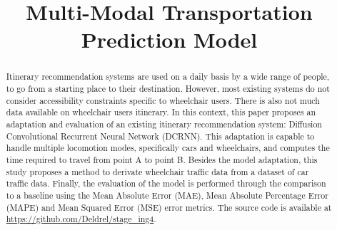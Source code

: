 \documentclass[conference]{IEEEtran}
\begin{document}



    \title{Multi-Modal Transportation Prediction Model}
    \author{
        \and
        \and
    }

    \maketitle

    \begin{abstract}
        Itinerary recommendation systems are used on a daily basis by a wide range of people, to go from a starting place to their destination.
        However, most existing systems do not consider accessibility constraints specific to wheelchair users.
        There is also not much data available on wheelchair users itinerary.
        In this context, this paper proposes an adaptation and evaluation of an existing itinerary recommendation system: Diffusion Convolutional Recurrent Neural Network (DCRNN).
        This adaptation is capable to handle multiple locomotion modes, specifically cars and wheelchairs, and computes the time required to travel from point A to point B.
        Besides the model adaptation, this study proposes a method to derivate wheelchair traffic data from a dataset of car traffic data.
        Finally, the evaluation of the model is performed through the comparison to a baseline using the Mean Absolute Error (MAE), Mean Absolute Percentage Error (MAPE) and Mean Squared Error (MSE) error metrics.
        The source code is available at \url{https://github.com/Deldrel/stage_ing4}.
    \end{abstract}
\end{document}
